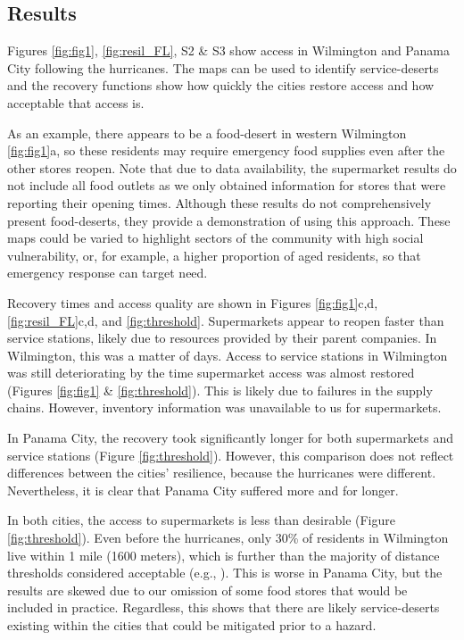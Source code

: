 \documentclass[onecolumn,doublespacing]{risa}
\let \citeA \textcite
\begin{document}
\subsection{Results}
Figures \ref{fig:fig1}, \ref{fig:resil_FL}, S2 \& S3 show access in Wilmington and Panama City following the hurricanes. 
The maps can be used to identify service-deserts and the recovery functions show how quickly the cities restore access and how acceptable that access is.

As an example, there appears to be a food-desert in western Wilmington \ref{fig:fig1}a, so these residents may require emergency food supplies even after the other stores reopen.
Note that due to data availability, the supermarket results do not include all food outlets as we only obtained information for stores that were reporting their opening times.
Although these results do not comprehensively present food-deserts, they provide a demonstration of using this approach.
These maps could be varied to highlight sectors of the community with high social vulnerability, or, for example, a higher proportion of aged residents, so that emergency response can target need.

Recovery times and access quality are shown in Figures \ref{fig:fig1}c,d, \ref{fig:resil_FL}c,d, and \ref{fig:threshold}. 
Supermarkets appear to reopen faster than service stations, likely due to resources provided by their parent companies.
In Wilmington, this was a matter of days.
Access to service stations in Wilmington was still deteriorating by the time supermarket access was almost restored (Figures \ref{fig:fig1} \& \ref{fig:threshold}).
This is likely due to failures in the supply chains.
However, inventory information was unavailable to us for supermarkets.

In Panama City, the recovery took significantly longer for both supermarkets and service stations (Figure \ref{fig:threshold}).
However, this comparison does not reflect differences between the cities' resilience, because the hurricanes were different. 
Nevertheless, it is clear that Panama City suffered more and for longer.

In both cities, the access to supermarkets is less than desirable (Figure \ref{fig:threshold}).
Even before the hurricanes, only 30\% of residents in Wilmington live within 1 mile (1600 meters), which is further than the majority of distance thresholds considered acceptable (e.g., \citeA{Talen2003-dc}).
This is worse in Panama City, but the results are skewed due to our omission of some food stores that would be included in practice.
Regardless, this shows that there are likely service-deserts existing within the cities that could be mitigated prior to a hazard.
\end{document}
